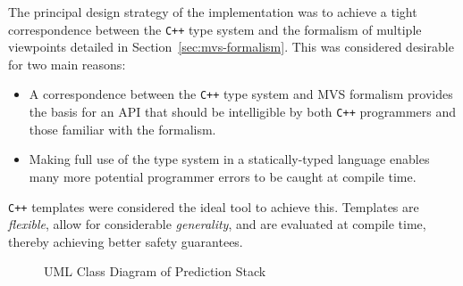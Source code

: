 \documentclass[12pt,a4paper,twoside,openright]{report}
\newcommand{\sref}[1]{Section~\ref{#1}}
\begin{document}
The principal design strategy of the implementation was to achieve a tight
correspondence between the \texttt{C++} type system and the formalism of
multiple viewpoints detailed in \sref{sec:mvs-formalism}. This was
considered desirable for two main reasons:
\begin{itemize}
  \item A correspondence between the \texttt{C++} type system and MVS formalism
    provides the basis for an API that should be intelligible by both
    \texttt{C++} programmers and those familiar with the formalism.
  \item Making full use of the type system in a statically-typed language 
    enables many more potential programmer errors to be caught at compile time.
\end{itemize}

\texttt{C++} templates were considered the ideal tool to achieve this. Templates
are \emph{flexible}, allow for considerable \emph{generality}, and are evaluated
at compile time, thereby achieving better safety guarantees.

\begin{figure}[H]
\centering
\hspace{-10mm}
\caption{UML Class Diagram of Prediction Stack}
\label{fig:uml-prediction}
\end{figure}
\end{document}
